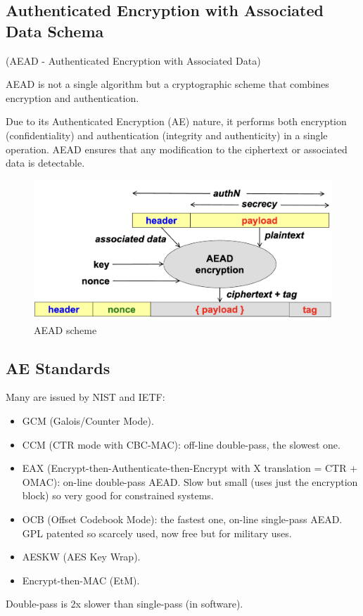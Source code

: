 \subsection{Authenticated Encryption with Associated Data Schema}
\begin{center}
    (AEAD - Authenticated Encryption with Associated Data)
\end{center}
\begin{tcolorbox}[colback=red!10!white, colframe=red!70!black, coltitle=white, title=Beware]
    AEAD is not a single algorithm but a cryptographic scheme that combines encryption and authentication. 
\end{tcolorbox}
Due to its Authenticated Encryption (AE) nature, it performs both encryption (confidentiality) and authentication (integrity and authenticity) in a single operation. AEAD ensures that any modification to the ciphertext or associated data is detectable.

\begin{figure}[H]
    \centering
    \includegraphics[width=0.6\linewidth]{Images/Cryptography/aead.png}
    \caption{AEAD scheme}
\end{figure}

\subsection{AE Standards}
Many are issued by NIST and IETF:
\begin{itemize}
    \item GCM (Galois/Counter Mode).
    \item CCM (CTR mode with CBC-MAC): off-line double-pass, the slowest one.
    \item EAX (Encrypt-then-Authenticate-then-Encrypt with X translation = CTR + OMAC): on-line double-pass AEAD. Slow but small (uses just the encryption block) so very good for constrained systems.
    \item OCB (Offset Codebook Mode): the fastest one, on-line single-pass AEAD. GPL patented so scarcely used, now free but for military uses.
    \item AESKW (AES Key Wrap).
    \item Encrypt-then-MAC (EtM).
\end{itemize}
\begin{tcolorbox}[colback=blue!10!white, colframe=blue!50!white]
Double-pass is 2x slower than single-pass (in software).
\end{tcolorbox}

